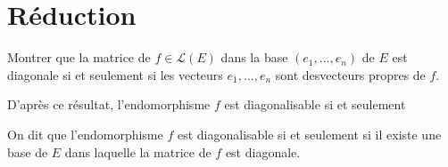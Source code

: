 \documentclass[12pt,a4paper]{article}
\newcommand{\Ll}{\mathcal{L}}
\def\be{\begin{exo}}
\def\ee{\end{exo}}
\def\bd{\begin{df}}
\def\ed{\end{df}}
\begin{document}
\section{Réduction}
\be
Montrer que la matrice de $f\in \Ll(E)$ dans la base $(e_1,...,e_n)$ de $E$ est diagonale si et seulement si les vecteurs $e_1,...,e_n$ sont desvecteurs propres de $f$.
\ee
D'après ce résultat, l'endomorphisme $f$ est diagonalisable si et seulement
\bd
On dit que l'endomorphisme $f$ est diagonalisable si et seulement si il existe une base de $E$ dans laquelle la matrice de $f$ est diagonale.
\ed
\end{document}
